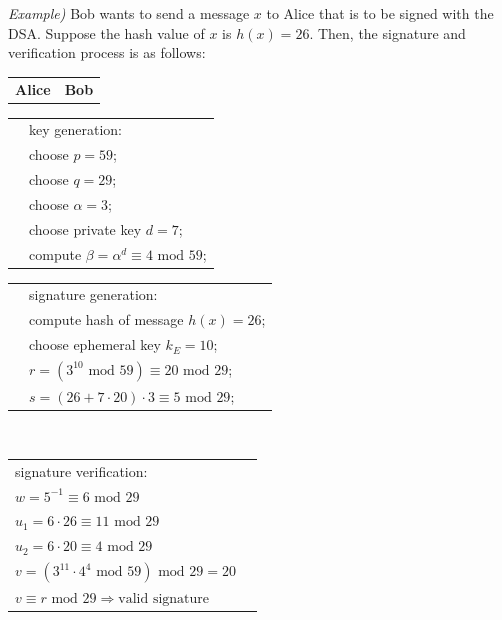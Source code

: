 \documentclass[11pt, a4paper]{article}
\newcommand{\mymod}{
    \text{ mod }
}
\begin{document}
\newpage
\hfill\break
\textit{Example)} Bob wants to send a message $x$ to Alice that is to be signed with the DSA. Suppose the hash value of $x$ is $h(x)=26$. Then, the signature and verification process is as follows:
\begin{center}
\begin{framed}
    \begin{tabular}{c@{\hskip 10cm}c}
        \textbf{Alice}&\textbf{Bob}
    \end{tabular}
    \begin{tabular}{l@{\hskip 10cm}l}
        &key generation:\\
        &choose $p=59$;\\
        &choose $q=29$;\\
        &choose $\alpha=3$;\\
        &choose private key $d=7$;\\
        &compute $\beta=\alpha^d\equiv4\mymod59$;
    \end{tabular}
    \begin{tabular}{l@{\hskip 11cm}l}
        &signature generation:\\
        &compute hash of message $h(x)=26$;\\
        &choose ephemeral key $k_E=10$;\\
        &$r=(3^{10}\mymod59)\equiv20\mymod29$;\\
        &$s=(26+7\cdot20)\cdot3\equiv5\mymod29$;
    \end{tabular}
    \\
    \begin{tabular}{l@{\hskip 11cm}l}
        signature verification:&\\
        $w=5^{-1}\equiv6\mymod29$&\\
        $u_1=6\cdot26\equiv11\mymod29$&\\
        $u_2=6\cdot20\equiv4\mymod29$&\\
        $v=(3^{11}\cdot4^4\mymod59)\mymod29=20$&\\
        $v\equiv r\mymod29\Longrightarrow\text{valid signature}$&
    \end{tabular}
\end{framed}
\end{center}
\end{document}

